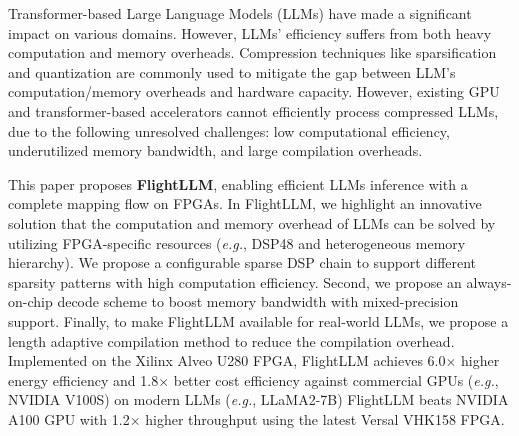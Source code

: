 Transformer-based Large Language Models (LLMs) have made a significant impact on various domains. However, LLMs' efficiency suffers from both heavy computation and memory overheads.
Compression techniques like sparsification and quantization are commonly used to mitigate the gap between LLM's computation/memory overheads and hardware capacity. However, existing GPU and transformer-based accelerators cannot efficiently process compressed LLMs, due to the following unresolved challenges: low computational efficiency, underutilized memory bandwidth, and large compilation overheads.

This paper proposes \textbf{FlightLLM}, enabling efficient LLMs inference with a complete mapping flow on FPGAs. 
In FlightLLM, we highlight an innovative solution that the computation and memory overhead of LLMs can be solved by utilizing FPGA-specific resources (\textit{e.g.}, DSP48 and heterogeneous memory hierarchy). 
We propose a configurable sparse DSP chain to support different sparsity patterns with high computation efficiency.
Second, we propose an always-on-chip decode scheme to boost memory bandwidth with mixed-precision support.
Finally, to make FlightLLM available for real-world LLMs, we propose a length adaptive compilation method to reduce the compilation overhead.  
Implemented on the Xilinx Alveo U280 FPGA, FlightLLM achieves 6.0$\times$ higher energy efficiency and 1.8$\times$ better cost efficiency against commercial GPUs (\textit{e.g.}, NVIDIA V100S) on modern LLMs (\textit{e.g.}, LLaMA2-7B)  FlightLLM beats NVIDIA A100 GPU with 1.2$\times$ higher throughput using the latest Versal VHK158 FPGA.



